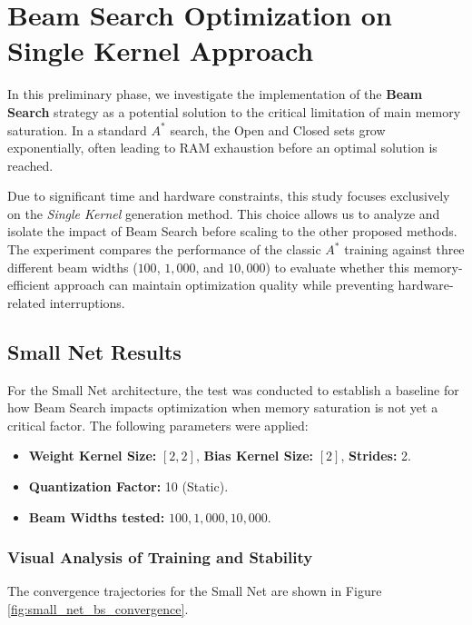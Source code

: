 \newpage

\section{Beam Search Optimization on Single Kernel Approach}\label{sec:beam_search_study}
In this preliminary phase, we investigate the implementation of the \textbf{Beam Search} strategy as a potential solution to the critical limitation of main memory saturation. In a standard $A^*$ search, the Open and Closed sets grow exponentially, often leading to RAM exhaustion before an optimal solution is reached.

Due to significant time and hardware constraints, this study focuses exclusively on the \textit{Single Kernel} generation method. This choice allows us to analyze and isolate the impact of Beam Search before scaling to the other proposed methods. The experiment compares the performance of the classic $A^*$ training against three different beam widths ($100$, $1,000$, and $10,000$) to evaluate whether this memory-efficient approach can maintain optimization quality while preventing hardware-related interruptions.

\subsection{Small Net Results}

For the Small Net architecture, the test was conducted to establish a baseline for how Beam Search impacts optimization when memory saturation is not yet a critical factor. The following parameters were applied:

\begin{itemize}
    \item \textbf{Weight Kernel Size:} $[2,2]$, \textbf{Bias Kernel Size:} $[2]$, \textbf{Strides:} 2.
    \item \textbf{Quantization Factor:} 10 (Static).
    \item \textbf{Beam Widths tested:} $100, 1,000, 10,000$.
    
\end{itemize}

\subsubsection{Visual Analysis of Training and Stability}

The convergence trajectories for the Small Net are shown in Figure \ref{fig:small_net_bs_convergence}.

